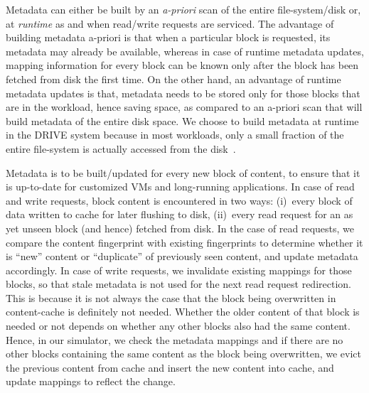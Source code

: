 Metadata can either be built by an \textit{a-priori} scan of the entire
file-system/disk or, at \textit{runtime} as and when read/write
requests are serviced. The advantage of building metadata a-priori is that
when a particular block is requested, its metadata may already be
available,
whereas in case of runtime metadata updates, mapping information for
every block can be known only after the block has been fetched from disk
the first time.
On the other hand, an advantage of runtime metadata updates is that,
metadata needs to be stored only for those blocks that are in the workload,
hence saving space, as compared to an a-priori scan that will build metadata
of the entire disk space. We choose to build metadata at runtime in the
DRIVE system because in most workloads, only a small fraction of the 
entire file-system is actually accessed from the disk~\cite{iodedup}.

Metadata is to be built/updated for every new block of content, to ensure that
it is up-to-date for customized VMs and long-running applications.
In case of read and write requests, block content is encountered in two ways:
(i)~every block of data written to cache for later flushing to disk,
(ii)~every read request for an as yet unseen block (and hence) fetched
from disk. 
In the case of read requests, we compare the 
content fingerprint
with existing fingerprints to determine
whether it is ``new'' content or ``duplicate'' of previously seen content,
and update metadata accordingly.
In case of write requests, we invalidate existing mappings for those blocks,
so that stale metadata is not used for the next read request redirection.
This is because it is not always the case that the block being overwritten 
in content-cache is definitely not needed. Whether the older content of 
that block is needed or not depends on whether any other blocks also had 
the same content. Hence, in our simulator, we check the metadata mappings 
and if there are no other blocks containing the same content as the block 
being overwritten, we evict the previous content from cache and insert the 
new content into cache, and update mappings to reflect the change. 

